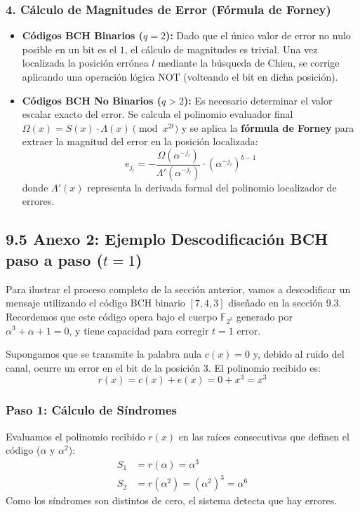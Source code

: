 \documentclass{article}
\begin{document}
\subsubsection{4. Cálculo de Magnitudes de Error (Fórmula de Forney)}
\begin{itemize}
    \item \textbf{Códigos BCH Binarios ($q=2$):} Dado que el único valor de error no nulo posible en un bit es el $1$, el cálculo de magnitudes es trivial. Una vez localizada la posición errónea $l$ mediante la búsqueda de Chien, se corrige aplicando una operación lógica NOT (volteando el bit en dicha posición).
    \item \textbf{Códigos BCH No Binarios ($q>2$):} Es necesario determinar el valor escalar exacto del error. Se calcula el polinomio evaluador final $\Omega(x) = S(x)\cdot\Lambda(x) \pmod{x^{2t}}$ y se aplica la \textbf{fórmula de Forney} para extraer la magnitud del error en la posición localizada:
    \[
    e_{j_l} = - \frac{\Omega(\alpha^{-j_l})}{\Lambda'(\alpha^{-j_l})} \cdot (\alpha^{-j_l})^{b-1}
    \]
    donde $\Lambda'(x)$ representa la derivada formal del polinomio localizador de errores.
\end{itemize}

\subsection{9.5 Anexo 2: Ejemplo Descodificación BCH paso a paso \texorpdfstring{($t=1$)}{(t=1)}}

Para ilustrar el proceso completo de la sección anterior, vamos a descodificar un mensaje utilizando el código BCH binario $[7, 4, 3]$ diseñado en la sección 9.3. Recordemos que este código opera bajo el cuerpo $\mathbb{F}_{2^3}$ generado por $\alpha^3 + \alpha + 1 = 0$, y tiene capacidad para corregir $t = 1$ error.

Supongamos que se transmite la palabra nula $c(x) = 0$ y, debido al ruido del canal, ocurre un error en el bit de la posición 3. El polinomio recibido es:
\[
r(x) = c(x) + e(x) = 0 + x^3 = x^3
\]

\subsubsection{Paso 1: Cálculo de Síndromes}
Evaluamos el polinomio recibido $r(x)$ en las raíces consecutivas que definen el código ($\alpha$ y $\alpha^2$):
\begin{align*}
S_1 &= r(\alpha) = \alpha^3 \\
S_2 &= r(\alpha^2) = (\alpha^2)^3 = \alpha^6
\end{align*}
Como los síndromes son distintos de cero, el sistema detecta que hay errores.
\end{document}
